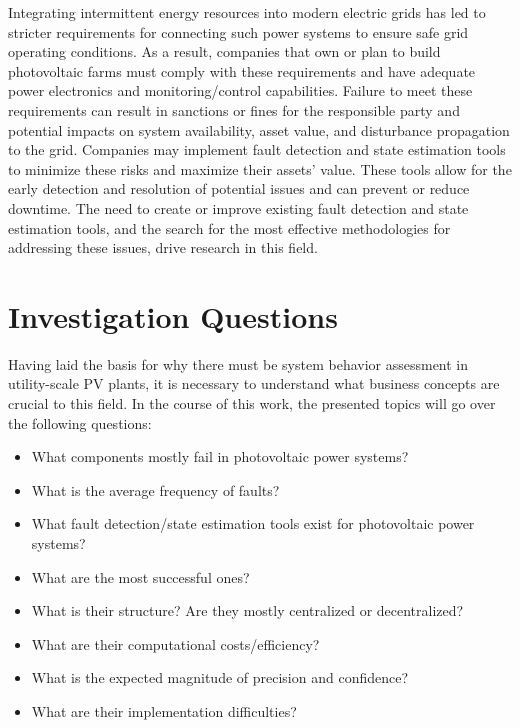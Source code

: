 Integrating intermittent energy resources into modern electric grids has led to stricter requirements for connecting such power systems to ensure safe grid operating conditions. As a result, companies that own or plan to build photovoltaic farms must comply with these requirements and have adequate power electronics and monitoring/control capabilities. Failure to meet these requirements can result in sanctions or fines for the responsible party and potential impacts on system availability, asset value, and disturbance propagation to the grid. Companies may implement fault detection and state estimation tools to minimize these risks and maximize their assets' value. These tools allow for the early detection and resolution of potential issues and can prevent or reduce downtime. The need to create or improve existing fault detection and state estimation tools, and the search for the most effective methodologies for addressing these issues, drive research in this field.

\section{Investigation Questions}

Having laid the basis for why there must be system behavior assessment in utility-scale PV plants, it is necessary to understand what business concepts are crucial to this field. In the course of this work, the presented topics will go over the following questions:

\begin{itemize}
    \item What components mostly fail in photovoltaic power systems?
    \item What is the average frequency of faults?
    \item What fault detection/state estimation tools exist for photovoltaic
    power systems?
    \item What are the most successful ones?
    \item What is their structure? Are they mostly centralized or decentralized?
    \item What are their computational costs/efficiency?
    \item What is the expected magnitude of precision and confidence?
    \item What are their implementation difficulties?
\end{itemize}

